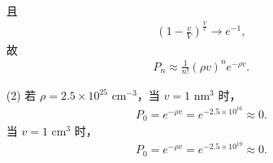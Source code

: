 \documentclass{assignment}
\begin{document}
\begin{sol}
\begin{itemize}
\begin{align}
        \end{align}
        且
        \begin{align}
            \left(1-\frac{v}{V}\right)^{\frac{V}{v}}\rightarrow e^{-1},
        \end{align}
        故
        \begin{align}
            P_n\approx\frac{1}{n!}(\rho v)^ne^{-\rho v}.
        \end{align}
        \item[(2)] 若 $\rho=2.5\times 10^{25}\text{ cm}^{-3}$，当 $v=1\text{ nm}^3$ 时，
        \begin{align}
            P_0=e^{-\rho v}=e^{-2.5\times 10^{16}}\approx 0.
        \end{align}
        当 $v=1\text{ cm}^3$ 时，
        \begin{align}
            P_0=e^{-\rho v}=e^{-2.5\times 10^{19}}\approx 0.
        \end{align}
    \end{itemize}
\end{sol}
\end{document}
